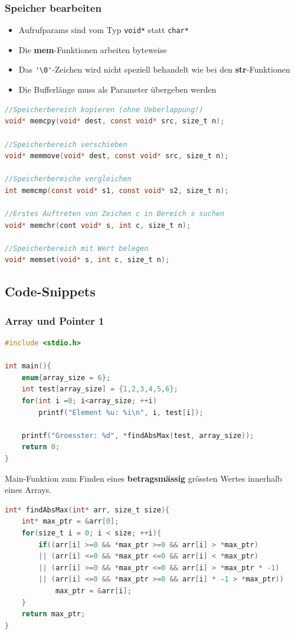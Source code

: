 		\subsubsection{Speicher bearbeiten}
			\begin{itemize}
				\item Aufrufparams sind vom Typ \verb|void*| statt \verb|char*|
				\item Die \textbf{mem}-Funktionen arbeiten byteweise
				\item Das \verb|'\0'|-Zeichen wird nicht speziell behandelt wie bei den \textbf{str}-Funktionen
				\item Die Bufferlänge muss als Parameter übergeben werden
			\end{itemize}
			\begin{lstlisting}[language=C]
//Speicherbereich kopieren (ohne Ueberlappung!)
void* memcpy(void* dest, const void* src, size_t n);

//Speicherbereich verschieben
void* memmove(void* dest, const void* src, size_t n);

//Speicherbereiche vergleichen
int memcmp(const void* s1, const void* s2, size_t n);

//Erstes Auftreten von Zeichen c in Bereich s suchen
void* memchr(cont void* s, int c, size_t n);

//Speicherbereich mit Wert belegen
void* memset(void* s, int c, size_t n);
			\end{lstlisting}

	\subsection{Code-Snippets}
		\subsubsection{Array und Pointer 1}
			\begin{lstlisting}[language=C]
#include <stdio.h>

int main(){
	enum{array_size = 6};
	int test[array_size] = {1,2,3,4,5,6};
	for(int i =0; i<array_size; ++i)
		printf("Element %u: %i\n", i, test[i]);
	
	printf("Groesster: %d", *findAbsMax(test, array_size));
	return 0;
}
			\end{lstlisting}
			Main-Funktion zum Finden eines \textbf{betragsmässig} grössten Wertes innerhalb eines Arrays.

			\begin{lstlisting}[language=C]
int* findAbsMax(int* arr, size_t size){
	int* max_ptr = &arr[0];
	for(size_t i = 0; i < size; ++i){
		if((arr[i] >=0 && *max_ptr >=0 && arr[i] > *max_ptr)
		|| (arr[i] <=0 && *max_ptr <=0 && arr[i] < *max_ptr)
		|| (arr[i] >=0 && *max_ptr <=0 && arr[i] > *max_ptr * -1)
		|| (arr[i] <=0 && *max_ptr >=0 && arr[i] * -1 > *max_ptr))
			max_ptr = &arr[i];
	}
	return max_ptr;
}
			\end{lstlisting}
		

